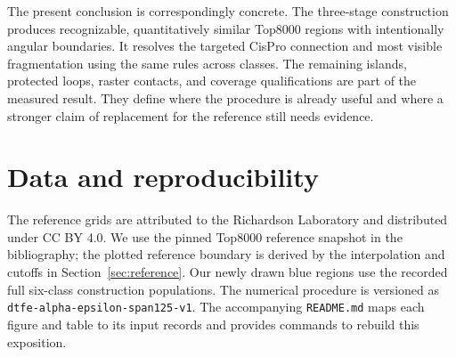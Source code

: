 \documentclass[11pt]{article}
\newcommand{\protocol}{\texttt{dtfe-alpha-epsilon-span125-v1}}
\begin{document}
The present conclusion is correspondingly concrete. The three-stage
construction produces recognizable, quantitatively similar Top8000
regions with intentionally angular boundaries. It resolves the targeted
CisPro connection and most visible fragmentation using the same rules
across classes. The remaining islands, protected loops, raster contacts,
and coverage qualifications are part of the measured result. They define
where the procedure is already useful and where a stronger claim of
replacement for the reference still needs evidence.

\section*{Data and reproducibility}

The reference grids are attributed to the Richardson Laboratory and
distributed under CC BY 4.0. We use the pinned Top8000 reference snapshot
in the bibliography; the plotted reference boundary is derived by the
interpolation and cutoffs in Section~\ref{sec:reference}. Our newly drawn
blue regions use the recorded full six-class construction populations.
The numerical procedure is versioned as \protocol. The accompanying
\texttt{README.md} maps each figure and table to its input records and
provides commands to rebuild this exposition.

{\small
\setlength{\bibsep}{5pt}


}
\end{document}
